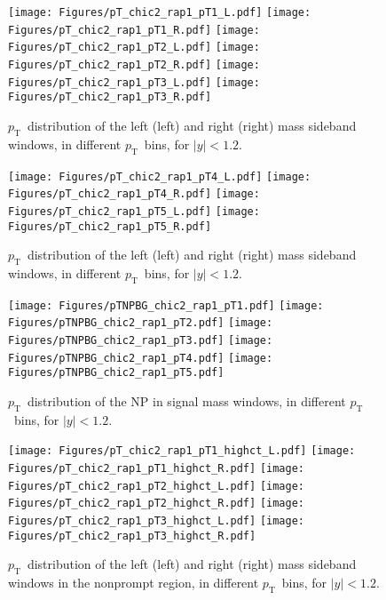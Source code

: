 \documentclass[12pt]{article}
\newcommand{\pt}{$p_{\mathrm{T}}$}
\begin{document}
\begin{figure}[htbp]
\centering
\texttt{[image: Figures/pT\_chic2\_rap1\_pT1\_L.pdf]}
\texttt{[image: Figures/pT\_chic2\_rap1\_pT1\_R.pdf]}
\texttt{[image: Figures/pT\_chic2\_rap1\_pT2\_L.pdf]}
\texttt{[image: Figures/pT\_chic2\_rap1\_pT2\_R.pdf]}
\texttt{[image: Figures/pT\_chic2\_rap1\_pT3\_L.pdf]}
\texttt{[image: Figures/pT\_chic2\_rap1\_pT3\_R.pdf]}
\caption{\pt\ distribution of the left (left) and
  right (right) mass sideband windows, in different
  \pt\ bins, for $|y| < 1.2$.}
\end{figure}
\clearpage

\begin{figure}[htbp]
\centering
\texttt{[image: Figures/pT\_chic2\_rap1\_pT4\_L.pdf]}
\texttt{[image: Figures/pT\_chic2\_rap1\_pT4\_R.pdf]}
\texttt{[image: Figures/pT\_chic2\_rap1\_pT5\_L.pdf]}
\texttt{[image: Figures/pT\_chic2\_rap1\_pT5\_R.pdf]}
\caption{\pt\ distribution of the left (left) and
  right (right) mass sideband windows, in different
  \pt\ bins, for $|y| < 1.2$.}
\end{figure}
\clearpage

\begin{figure}[htbp]
\centering
\texttt{[image: Figures/pTNPBG\_chic2\_rap1\_pT1.pdf]}
\texttt{[image: Figures/pTNPBG\_chic2\_rap1\_pT2.pdf]}
\texttt{[image: Figures/pTNPBG\_chic2\_rap1\_pT3.pdf]}
\texttt{[image: Figures/pTNPBG\_chic2\_rap1\_pT4.pdf]}
\texttt{[image: Figures/pTNPBG\_chic2\_rap1\_pT5.pdf]}
\caption{\pt\ distribution of the NP in signal mass
  windows, in different \pt\ bins, for $|y| < 1.2$.}
\end{figure}
\clearpage

\begin{figure}[htbp]
\centering
\texttt{[image: Figures/pT\_chic2\_rap1\_pT1\_highct\_L.pdf]}
\texttt{[image: Figures/pT\_chic2\_rap1\_pT1\_highct\_R.pdf]}
\texttt{[image: Figures/pT\_chic2\_rap1\_pT2\_highct\_L.pdf]}
\texttt{[image: Figures/pT\_chic2\_rap1\_pT2\_highct\_R.pdf]}
\texttt{[image: Figures/pT\_chic2\_rap1\_pT3\_highct\_L.pdf]}
\texttt{[image: Figures/pT\_chic2\_rap1\_pT3\_highct\_R.pdf]}
\caption{\pt\ distribution of the left (left) and
  right (right) mass sideband windows in the nonprompt region, in
  different
  \pt\ bins, for $|y| < 1.2$.}
\end{figure}
\clearpage
\end{document}
